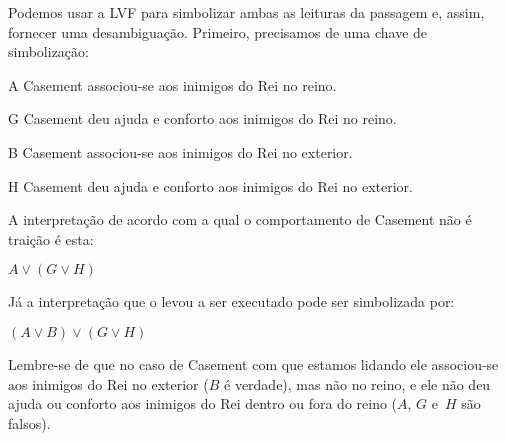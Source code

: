 Podemos usar a LVF para simbolizar ambas as leituras da passagem e, assim, fornecer uma desambiguação. Primeiro, precisamos de uma chave de simbolização:
\begin{ekey}
	\item [A] Casement associou-se aos inimigos do Rei no reino.
	\item [G] Casement deu ajuda e conforto aos inimigos do Rei no reino.
	\item [B] Casement associou-se aos inimigos do Rei no exterior.
	\item [H] Casement deu ajuda e conforto aos inimigos do Rei no exterior.
\end{ekey}
A interpretação de acordo com a qual o comportamento de Casement não é traição é esta:
\begin{earg}
	\item [] $A \lor (G \lor H)$
\end{earg}
Já a interpretação que o levou a ser executado pode ser simbolizada por:
\begin{earg}
	\item [] $(A \lor B) \lor (G \lor H)$
\end{earg}
Lembre-se de que no caso de Casement com que estamos lidando ele associou-se aos inimigos do Rei no exterior ($B$ é verdade), mas não no reino, e ele não deu ajuda ou conforto aos inimigos do Rei dentro ou fora do reino ($A$, $G$ e~$H$ são falsos). 

